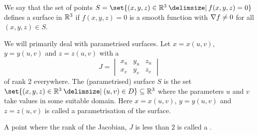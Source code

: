 \documentclass[11pt]{penrose}
\begin{document}
We say that the set of points $S = \set{(x,y,z) \in \R^3 \st f(x,y,z) = 0}$ defines a surface in $\mathbb{R}^3$ if $f(x,y,z) = 0$ is a smooth function with $\nabla f \neq 0$ for all $(x,y,z) \in S$.

We will primarily deal with parametrised surfaces. Let $x = x(u,v)$, $y = y(u,v)$ and $z = z(u,v)$ with a 
\begin{equation}
    J = \begin{vmatrix} x_u & y_u & z_u\\ x_v & y_v & z_v \end{vmatrix}
\end{equation}
of rank $2$ everywhere. The (parametrised) surface $S$ is the set $\set{(x,y,z) \in \R^3 \st (u,v) \in D} \subseteq \R^3$ where the parameters $u$ and $v$ take values in some suitable domain. Here $x = x(u,v)$, $y = y(u,v)$ and $z = z(u,v)$ is called a parametrisation of the surface.

A point where the rank of the Jacobian, $J$ is less than $2$ is called a .
\end{document}
